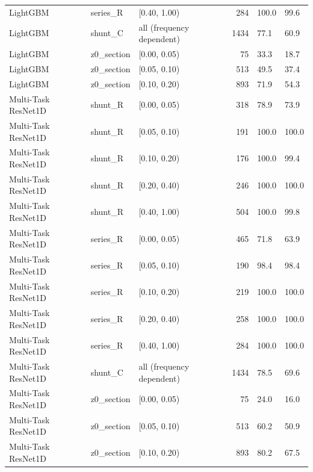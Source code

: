 \begin{tabular}{lllrll}
LightGBM & series\_R & [0.40, 1.00) & 284 & 100.0 & 99.6 \\
LightGBM & shunt\_C & all (frequency dependent) & 1434 & 77.1 & 60.9 \\
LightGBM & z0\_section & [0.00, 0.05) & 75 & 33.3 & 18.7 \\
LightGBM & z0\_section & [0.05, 0.10) & 513 & 49.5 & 37.4 \\
LightGBM & z0\_section & [0.10, 0.20) & 893 & 71.9 & 54.3 \\
Multi-Task ResNet1D & shunt\_R & [0.00, 0.05) & 318 & 78.9 & 73.9 \\
Multi-Task ResNet1D & shunt\_R & [0.05, 0.10) & 191 & 100.0 & 100.0 \\
Multi-Task ResNet1D & shunt\_R & [0.10, 0.20) & 176 & 100.0 & 99.4 \\
Multi-Task ResNet1D & shunt\_R & [0.20, 0.40) & 246 & 100.0 & 100.0 \\
Multi-Task ResNet1D & shunt\_R & [0.40, 1.00) & 504 & 100.0 & 99.8 \\
Multi-Task ResNet1D & series\_R & [0.00, 0.05) & 465 & 71.8 & 63.9 \\
Multi-Task ResNet1D & series\_R & [0.05, 0.10) & 190 & 98.4 & 98.4 \\
Multi-Task ResNet1D & series\_R & [0.10, 0.20) & 219 & 100.0 & 100.0 \\
Multi-Task ResNet1D & series\_R & [0.20, 0.40) & 258 & 100.0 & 100.0 \\
Multi-Task ResNet1D & series\_R & [0.40, 1.00) & 284 & 100.0 & 100.0 \\
Multi-Task ResNet1D & shunt\_C & all (frequency dependent) & 1434 & 78.5 & 69.6 \\
Multi-Task ResNet1D & z0\_section & [0.00, 0.05) & 75 & 24.0 & 16.0 \\
Multi-Task ResNet1D & z0\_section & [0.05, 0.10) & 513 & 60.2 & 50.9 \\
Multi-Task ResNet1D & z0\_section & [0.10, 0.20) & 893 & 80.2 & 67.5 \\
\bottomrule
\end{tabular}
